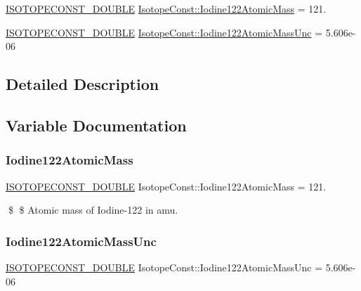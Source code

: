 \begin{DoxyCompactItemize}
\item 
\mbox{\hyperlink{group___isotope_const-_macros_ga8f45a7272ce02c0b4c65c44636ed719a}{I\+S\+O\+T\+O\+P\+E\+C\+O\+N\+S\+T\+\_\+\+D\+O\+U\+B\+LE}} \mbox{\hyperlink{group___isotope_const-_iodine-_i122_ga8cd510d5b8f7993c8626e877caaea0d9}{Isotope\+Const\+::\+Iodine122\+Atomic\+Mass}} = 121.
\item 
\mbox{\hyperlink{group___isotope_const-_macros_ga8f45a7272ce02c0b4c65c44636ed719a}{I\+S\+O\+T\+O\+P\+E\+C\+O\+N\+S\+T\+\_\+\+D\+O\+U\+B\+LE}} \mbox{\hyperlink{group___isotope_const-_iodine-_i122_ga7ead77b3245b479c55e232b1b3780295}{Isotope\+Const\+::\+Iodine122\+Atomic\+Mass\+Unc}} = 5.\+606e-\/06
\end{DoxyCompactItemize}


\subsection{Detailed Description}


\subsection{Variable Documentation}
\mbox{\label{group___isotope_const-_iodine-_i122_ga8cd510d5b8f7993c8626e877caaea0d9}} 
\subsubsection{\texorpdfstring{Iodine122\+Atomic\+Mass}{Iodine122AtomicMass}}
{\footnotesize\ttfamily \mbox{\hyperlink{group___isotope_const-_macros_ga8f45a7272ce02c0b4c65c44636ed719a}{I\+S\+O\+T\+O\+P\+E\+C\+O\+N\+S\+T\+\_\+\+D\+O\+U\+B\+LE}} Isotope\+Const\+::\+Iodine122\+Atomic\+Mass = 121.}

\$ \$ Atomic mass of Iodine-\/122 in amu. \mbox{\label{group___isotope_const-_iodine-_i122_ga7ead77b3245b479c55e232b1b3780295}} 
\subsubsection{\texorpdfstring{Iodine122\+Atomic\+Mass\+Unc}{Iodine122AtomicMassUnc}}
{\footnotesize\ttfamily \mbox{\hyperlink{group___isotope_const-_macros_ga8f45a7272ce02c0b4c65c44636ed719a}{I\+S\+O\+T\+O\+P\+E\+C\+O\+N\+S\+T\+\_\+\+D\+O\+U\+B\+LE}} Isotope\+Const\+::\+Iodine122\+Atomic\+Mass\+Unc = 5.\+606e-\/06}

